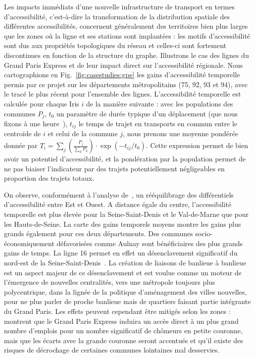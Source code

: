 Les impacts immédiats d'une nouvelle infrastructure de transport en termes d'accessibilité, c'est-à-dire la transformation de la distribution spatiale des différentes accessibilités,  concernent généralement des territoires bien plus larges que les zones où la ligne et ses stations sont implantées : les motifs d'accessibilité sont dus aux propriétés topologiques du réseau et celles-ci sont fortement discontinues en fonction de la structure du graphe. Illustrons le cas des lignes du Grand Paris Express et de leur impact direct sur l'accessibilité régionale. Nous cartographions en Fig.~\ref{fig:casestudies:gpe} les gains d'accessibilité temporelle permis par ce projet sur les départements métropolitains (75, 92, 93 et 94), avec le tracé le plus récent pour l'ensemble des lignes. L'accessibilité temporelle est calculée pour chaque Iris $i$ de la manière suivante : avec les populations des communes $P_j$, $t_0$ un paramètre de durée typique d'un déplacement (que nous fixons à une heure~\cite{zahavi1980regularities}), $t_{ij}$ le temps de trajet en transports en commun entre le centroïde de $i$ et celui de la commune $j$, nous prenons une moyenne pondérée donnée par $T_i = \sum_j \left(\frac{P_j}{\sum_k P_k}\right)\cdot \exp\left(- t_{ij}/t_0\right)$. Cette expression permet de bien avoir un potentiel d'accessibilité, et la pondération par la population permet de ne pas biaiser l'indicateur par des trajets potentiellement négligeables en proportion des trajets totaux.


On observe, conformément à l'analyse de~\cite{beaucire2013grand}, un rééquilibrage des différentiels d'accessibilité entre Est et Ouest. A distance égale du centre, l'accessibilité temporelle est plus élevée pour la Seine-Saint-Denis et le Val-de-Marne que pour les Hauts-de-Seine. La carte des gains temporels moyens montre les gains plus grands également pour ces deux départements. Des communes socio-économiquement défavorisées comme Aulnay sont bénéficiaires des plus grands gains de temps. La ligne 16 permet en effet un désenclavement significatif du nord-est de la Seine-Saint-Denis~\cite{desjardins2016grand}. La création de liaisons de banlieue à banlieue est un aspect majeur de ce désenclavement et est voulue comme un moteur de l'émergence de nouvelles centralités, vers une métropole toujours plus polycentrique, dans la lignée de la politique d'aménagement des villes nouvelles, pour ne plus parler de proche banlieue mais de quartiers faisant partie intégrante du Grand Paris. Les effets peuvent cependant être mitigés selon les zones : \cite{l2013grand} montrent que le Grand Paris Express induira un accès direct à un plus grand nombre d'emplois pour un nombre significatif de chômeurs en petite couronne, mais que les écarts avec la grande couronne seront accentués et qu'il existe des risques de décrochage de certaines communes lointaines mal desservies. 


